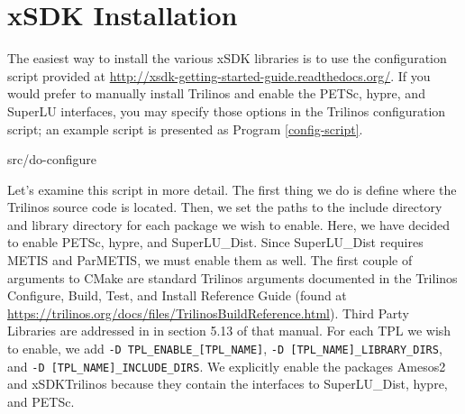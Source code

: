 \chapter{xSDK Installation}
The easiest way to install the various xSDK libraries is to use the
configuration script provided at
\url{http://xsdk-getting-started-guide.readthedocs.org/}.  
If you would prefer to manually install Trilinos and enable the PETSc, hypre,
and SuperLU interfaces, you may specify those options in the Trilinos configuration
script; an example script is presented as Program \ref{config-script}.

\begin{lstinputlisting}[caption=Sample
configuration script,label=config-script]{src/do-configure}
\end{lstinputlisting}

Let's examine this script in more detail.  The first thing we do is define
where the Trilinos source code is located.  Then, we set the paths to the
include directory and library directory for each package we wish to enable. 
Here, we have decided to enable PETSc, hypre, and SuperLU\_Dist.  Since
SuperLU\_Dist requires METIS and ParMETIS, we must enable them as well.
The first couple of arguments to CMake are standard Trilinos arguments
documented in the Trilinos Configure, Build, Test, and Install Reference Guide
(found at \url{https://trilinos.org/docs/files/TrilinosBuildReference.html}).
Third Party Libraries are addressed in in section 5.13 of that manual.  For each
TPL we wish to enable, we add {\tt -D TPL\_ENABLE\_[TPL\_NAME]}, {\tt -D
[TPL\_NAME]\_LIBRARY\_DIRS}, and {\tt -D [TPL\_NAME]\_INCLUDE\_DIRS}.  We
explicitly enable the packages Amesos2 and xSDKTrilinos because they contain the
interfaces to SuperLU\_Dist, hypre, and PETSc.